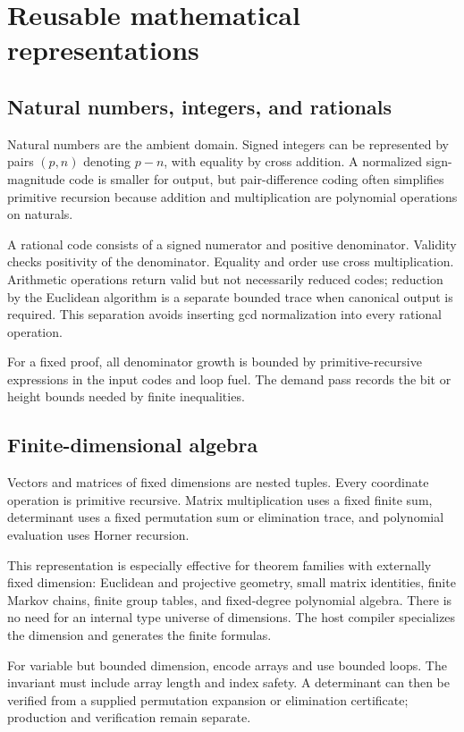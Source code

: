 \section{Reusable mathematical representations}

\subsection{Natural numbers, integers, and rationals}

Natural numbers are the ambient domain.  Signed integers can be represented by pairs \((p,n)\) denoting \(p-n\), with equality by cross addition.  A normalized sign-magnitude code is smaller for output, but pair-difference coding often simplifies primitive recursion because addition and multiplication are polynomial operations on naturals.

A rational code consists of a signed numerator and positive denominator.  Validity checks positivity of the denominator.  Equality and order use cross multiplication.  Arithmetic operations return valid but not necessarily reduced codes; reduction by the Euclidean algorithm is a separate bounded trace when canonical output is required.  This separation avoids inserting gcd normalization into every rational operation.

For a fixed proof, all denominator growth is bounded by primitive-recursive expressions in the input codes and loop fuel.  The demand pass records the bit or height bounds needed by finite inequalities.

\subsection{Finite-dimensional algebra}

Vectors and matrices of fixed dimensions are nested tuples.  Every coordinate operation is primitive recursive.  Matrix multiplication uses a fixed finite sum, determinant uses a fixed permutation sum or elimination trace, and polynomial evaluation uses Horner recursion.

This representation is especially effective for theorem families with externally fixed dimension: Euclidean and projective geometry, small matrix identities, finite Markov chains, finite group tables, and fixed-degree polynomial algebra.  There is no need for an internal type universe of dimensions.  The host compiler specializes the dimension and generates the finite formulas.

For variable but bounded dimension, encode arrays and use bounded loops.  The invariant must include array length and index safety.  A determinant can then be verified from a supplied permutation expansion or elimination certificate; production and verification remain separate.

